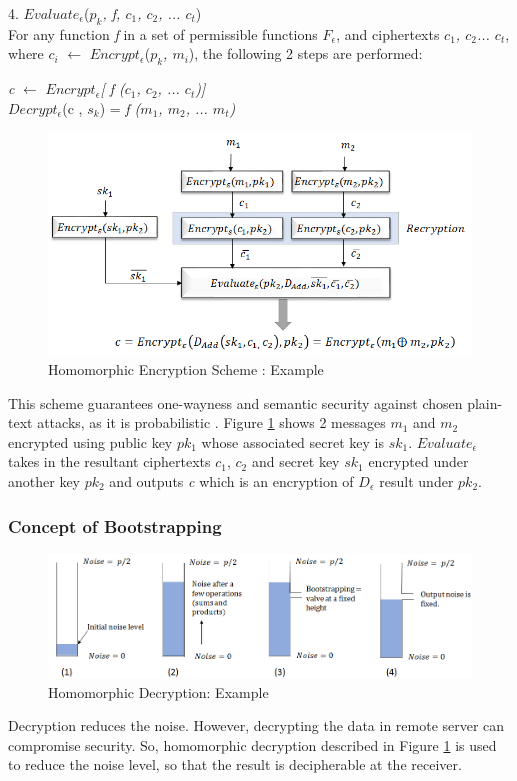 4. $Evaluate_\epsilon$(\textit{$p_k$, f, $c_1$, $c_2$, ... $c_t$})\\For any function \textit{f} in a set of permissible functions \textit{$F_\epsilon$}, and ciphertexts \textit{$c_1$, $c_2$... $c_t$}, where \textit{$c_i$} $\leftarrow$ \textit{$Encrypt_\epsilon$}(\textit{$p_k$, $m_i$}), the following 2 steps are performed:
\begin{adjustwidth}{2cm}{}
\textit{c} $\leftarrow$ \textit{$Encrypt_\epsilon$[ f ($c_1$, $c_2$, ... $c_t$)]}\\
$Decrypt_\epsilon$(c , $s_k$) = \textit{f ($m_1$, $m_2$, ... $m_t$)}
\end{adjustwidth}
\begin{figure}[h!]
 \centering
 \includegraphics[width=\linewidth]{figures/Eval_FHE.png}
 \caption{Homomorphic Encryption Scheme : Example
 \cite{gentry2010computing}}
 \label{fig:Eval_FHE}
\end{figure}
This scheme guarantees one-wayness and semantic security against chosen plain-text attacks, as it is probabilistic \cite{gentry2010computing}. Figure \ref{fig:Eval_FHE} shows 2 messages $m_1$ and $m_2$ encrypted using public key $pk_1$ whose associated secret key is $sk_1$. $Evaluate_\epsilon$ takes in the resultant ciphertexts $c_1$, $c_2$ and secret key $sk_1$ encrypted under another key $pk_2$ and outputs \textit{c} which is an encryption of $D_\epsilon$ result under $pk_2$.
\subsubsection*{Concept of Bootstrapping}
\begin{figure}[h!]
 \centering
 \includegraphics[width=\linewidth]{figures/bootstrapping.png}
 \caption{Homomorphic Decryption: Example
 \cite{he_utoronto}}
 \label{fig:bootstrapping}
\end{figure}
Decryption reduces the noise. However, decrypting the data in remote server can compromise security. So, homomorphic decryption described in Figure \ref{fig:Eval_FHE} is used to reduce the noise level, so that the result is decipherable at the receiver. 
